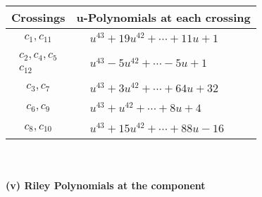\documentclass[1p]{elsarticle_modified}
\theoremstyle{definition}
\begin{document}
\begin{tabular}{m{50pt}|m{274pt}}
Crossings & \hspace{64pt}u-Polynomials at each crossing \\
\hline $$\begin{aligned}c_{1},c_{11}\end{aligned}$$&$\begin{aligned}
&u^{43}+19 u^{42}+\cdots+11 u+1
\end{aligned}$\\
\hline $$\begin{aligned}c_{2},c_{4},c_{5}\\c_{12}\end{aligned}$$&$\begin{aligned}
&u^{43}-5 u^{42}+\cdots-5 u+1
\end{aligned}$\\
\hline $$\begin{aligned}c_{3},c_{7}\end{aligned}$$&$\begin{aligned}
&u^{43}+3 u^{42}+\cdots+64 u+32
\end{aligned}$\\
\hline $$\begin{aligned}c_{6},c_{9}\end{aligned}$$&$\begin{aligned}
&u^{43}+u^{42}+\cdots+8 u+4
\end{aligned}$\\
\hline $$\begin{aligned}c_{8},c_{10}\end{aligned}$$&$\begin{aligned}
&u^{43}+15 u^{42}+\cdots+88 u-16
\end{aligned}$\\
\hline
\end{tabular}\\~\\
\newpage\renewcommand{\arraystretch}{1}
\flushleft \textbf{(v) Riley Polynomials at the component}\newline \\
\end{document}
